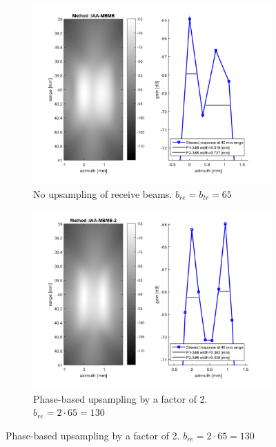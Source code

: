 \begin{figure}[ht]
    \centering
    \begin{subfigure}[t]{0.48\linewidth}
        \includegraphics[width=\linewidth]{./images/discussion/IAA-MBMB-standard.png}
        \caption{No upsampling of receive beams. $b_{re} = b_{tr} = 65$}
        \label{fig:phase1}
    \end{subfigure}
    \quad
    \begin{subfigure}[t]{0.48\linewidth}
        \includegraphics[width=\linewidth]{./images/discussion/IAA-MBMB-phase2.png}
        \caption{Phase-based upsampling by a factor of 2. $b_{re} = 2 \cdot 65 = 130$}
        \label{fig:phase2}
    \end{subfigure}

\end{figure}
